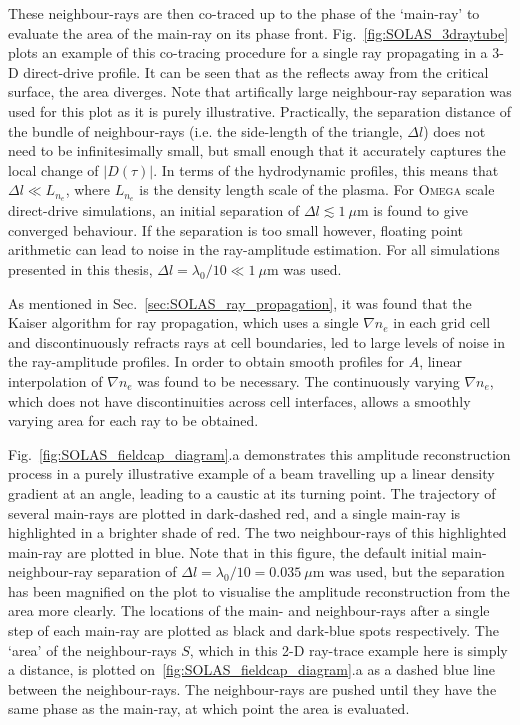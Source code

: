 These neighbour-rays are then co-traced up to the phase of the `main-ray' to evaluate the area of the main-ray on its phase front.
Fig.~\ref{fig:SOLAS_3draytube} plots an example of this co-tracing procedure for a single ray propagating in a 3-D direct-drive profile.
It can be seen that as the reflects away from the critical surface, the area diverges.
Note that artifically large neighbour-ray separation was used for this plot as it is purely illustrative.
Practically, the separation distance of the bundle of neighbour-rays (i.e. the side-length of the triangle, $\Delta l$) does not need to be infinitesimally small, but small enough that it accurately captures the local change of $|D(\tau)|$.
In terms of the hydrodynamic profiles, this means that $\Delta l \ll L_{n_e}$, where $L_{n_e}$ is the density length scale of the plasma.
For \textsc{Omega} scale direct-drive simulations, an initial separation of $\Delta l\lesssim 1\ \mu\text{m}$ is found to give converged behaviour.
If the separation is too small however, floating point arithmetic can lead to noise in the ray-amplitude estimation.
For all simulations presented in this thesis, $\Delta l=\lambda_0/10\ll1\ \mu\text{m}$ was used.

As mentioned in Sec.~\ref{sec:SOLAS_ray_propagation}, it was found that the Kaiser algorithm for ray propagation, which uses a single $\nabla n_e$ in each grid cell and discontinuously refracts rays at cell boundaries, led to large levels of noise in the ray-amplitude profiles.
In order to obtain smooth profiles for $A$, linear interpolation of $\nabla n_e$ was found to be necessary.
The continuously varying $\nabla n_e$, which does not have discontinuities across cell interfaces, allows a smoothly varying area for each ray to be obtained.

Fig.~\ref{fig:SOLAS_fieldcap_diagram}.a demonstrates this amplitude reconstruction process in a purely illustrative example of a beam travelling up a linear density gradient at an angle, leading to a caustic at its turning point.
The trajectory of several main-rays are plotted in dark-dashed red, and a single main-ray is highlighted in a brighter shade of red.
The two neighbour-rays of this highlighted main-ray are plotted in blue.
Note that in this figure, the default initial main-neighbour-ray separation of $\Delta l=\lambda_0/10=0.035\ \mu\text{m}$ was used, but the separation has been magnified on the plot to visualise the amplitude reconstruction from the area more clearly.
The locations of the main- and neighbour-rays after a single step of each main-ray are plotted as black and dark-blue spots respectively.
The `area' of the neighbour-rays $S$, which in this 2-D ray-trace example here is simply a distance, is plotted on~\ref{fig:SOLAS_fieldcap_diagram}.a as a dashed blue line between the neighbour-rays.
The neighbour-rays are pushed until they have the same phase as the main-ray, at which point the area is evaluated.

